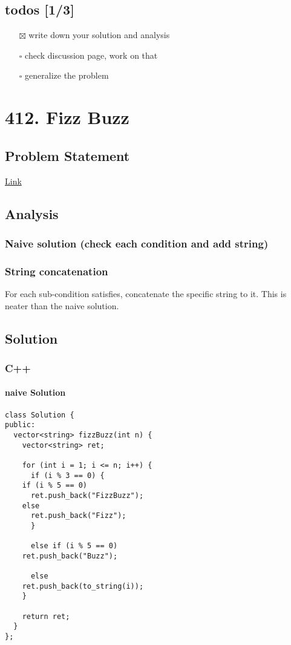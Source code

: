 \documentclass[12pt]{article}
\begin{document}
\subsection{todos [1/3]}
\label{sec:org9181e31}
\begin{itemize}
\item[{$\boxtimes$}] write down your solution and analysis
\item[{$\square$}] check discussion page, work on that
\item[{$\square$}] generalize the problem
\end{itemize}
\section{412. Fizz Buzz}
\label{sec:org9e30ea5}
\subsection{Problem Statement}
\label{sec:orgd5c0cb9}
\href{https://leetcode.com/problems/fizz-buzz/}{Link}
\subsection{Analysis}
\label{sec:orgf5c78bc}
\subsubsection{Naive solution (check each condition and add string)}
\label{sec:org03e6c6f}
\subsubsection{String concatenation}
\label{sec:org77c78cd}
For each sub-condition satisfies, concatenate the specific string to it. This is neater than the naive solution.
\subsection{Solution}
\label{sec:org314bed3}
\subsubsection{C++}
\label{sec:org4fee1c5}
\paragraph{naive Solution}
\label{sec:orgf27bb6e}
\begin{verbatim}
class Solution {
public:
  vector<string> fizzBuzz(int n) {
    vector<string> ret;

    for (int i = 1; i <= n; i++) {
      if (i % 3 == 0) {
	if (i % 5 == 0)
	  ret.push_back("FizzBuzz");
	else
	  ret.push_back("Fizz");
      }

      else if (i % 5 == 0)
	ret.push_back("Buzz");

      else
	ret.push_back(to_string(i));
    }

    return ret;
  }
};
\end{verbatim}
\end{document}
